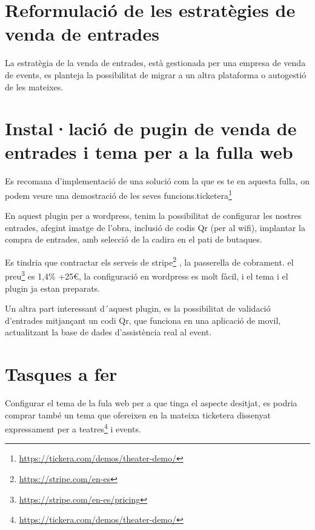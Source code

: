 \documentclass[
  10pt,
]{book}
\DeclareRobustCommand{\href}[2]{#2\footnote{\url{#1}}}
\begin{document}
\hypertarget{reformulaciuxf3-de-les-estratuxe8gies-de-venda-de-entrades}{%
\section{Reformulació de les estratègies de venda de entrades}\label{reformulaciuxf3-de-les-estratuxe8gies-de-venda-de-entrades}}

La estratègia de la venda de entrades, està gestionada per una empresa de venda de events, es planteja la possibilitat de migrar a un altra plataforma o autogestió de les mateixes.

\hypertarget{installaciuxf3-de-pugin-de-venda-de-entrades-i-tema-per-a-la-fulla-web}{%
\section{Instal·lació de pugin de venda de entrades i tema per a la fulla web}\label{installaciuxf3-de-pugin-de-venda-de-entrades-i-tema-per-a-la-fulla-web}}

Es recomana d'implementació de una solució com la que es te en aquesta fulla, on podem veure una demostració de les seves funcions.\href{https://tickera.com/demos/theater-demo/}{ticketera}

En aquest plugin per a wordpress, tenim la possibilitat de configurar les nostres entrades, afegint imatge de l'obra, inclusió de codis Qr (per al wifi), implantar la compra de entrades, amb selecció de la cadira en el pati de butaques.

Es tindria que contractar els serveis de \href{https://stripe.com/en-es}{stripe} , la passerella de cobrament. el \href{https://stripe.com/en-es/pricing}{preu} es 1,4\% +25€, la configuració en wordpress es molt fàcil, i el tema i el plugin ja estan preparats.

Un altra part interessant d´aquest plugin, es la possibilitat de validació d'entrades mitjançant un codi Qr, que funciona en una aplicació de movil, actualitzant la base de dades d'assistència real al event.

\hypertarget{tasques-a-fer}{%
\section{Tasques a fer}\label{tasques-a-fer}}

Configurar el tema de la fula web per a que tinga el aspecte desitjat, es podria comprar també un tema que ofereixen en la mateixa ticketera dissenyat expressament per a \href{https://tickera.com/demos/theater-demo/}{teatres} i events.

  
\end{document}
